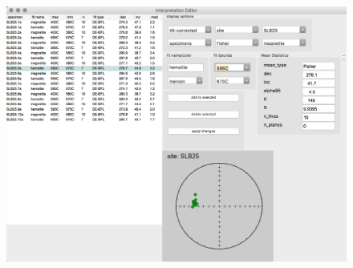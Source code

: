 \begin{figure}[htbp]
\centering
\includegraphics{./images/InterpEditor.png}
\caption{}
\end{figure}

